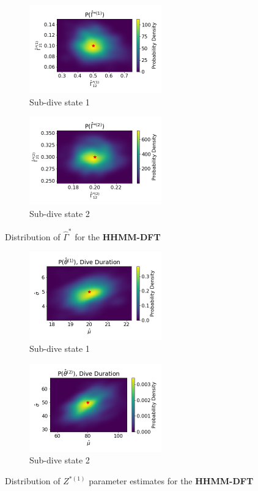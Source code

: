 \documentclass[12pt]{TD-CJS}
\begin{document}
\begin{figure}[ht]
	\centering
	\begin{subfigure}[t]{0.45\textwidth}
        \centering
        \includegraphics[width=2.25in]{../Plots/hhmm_FV_uncorr_Gamma_density_0.png}
        \caption{Sub-dive state 1}
    \end{subfigure}
    \begin{subfigure}[t]{0.45\textwidth}
        \centering
        \includegraphics[width=2.25in]{../Plots/hhmm_FV_uncorr_Gamma_density_1.png}
        \caption{Sub-dive state 2}
    \end{subfigure}
    \caption{Distribution of $\hat \Gamma^{*}$ for the \textbf{HHMM-DFT}}
\end{figure}

\begin{figure}[ht]
	\centering
	\begin{subfigure}[t]{0.45\textwidth}
        \centering
        \includegraphics[width=2.25in]{../Plots/hhmm_FV_uncorr_MLE_density_dive_duration_-1_0.png}
        \caption{Sub-dive state 1}
    \end{subfigure}
    \begin{subfigure}[t]{0.45\textwidth}
        \centering
        \includegraphics[width=2.25in]{../Plots/hhmm_FV_uncorr_MLE_density_dive_duration_-1_1.png}
        \caption{Sub-dive state 2}
    \end{subfigure}
    \caption{Distribution of $Z^{*(1)}$ parameter estimates for the \textbf{HHMM-DFT}}
\end{figure}
\end{document}

